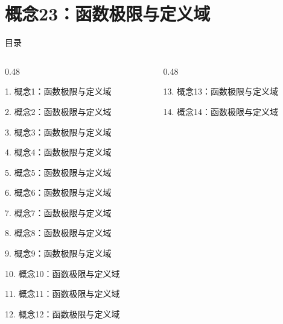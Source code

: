 \documentclass[aspectratio=169,10pt,fontset=fandol]{ctexbeamer}
\begin{document}
\section{概念23：函数极限与定义域}
\begin{frame}[t,fragile]{目录}
\small
\begin{columns}[T,onlytextwidth]
\begin{column}{0.48\textwidth}
{\color{black}\small 1. 概念1：函数极限与定义域\par}\vspace{0.22em}
{\color{black}\small 2. 概念2：函数极限与定义域\par}\vspace{0.22em}
{\color{black}\small 3. 概念3：函数极限与定义域\par}\vspace{0.22em}
{\color{black}\small 4. 概念4：函数极限与定义域\par}\vspace{0.22em}
{\color{black}\small 5. 概念5：函数极限与定义域\par}\vspace{0.22em}
{\color{black}\small 6. 概念6：函数极限与定义域\par}\vspace{0.22em}
{\color{black}\small 7. 概念7：函数极限与定义域\par}\vspace{0.22em}
{\color{black}\small 8. 概念8：函数极限与定义域\par}\vspace{0.22em}
{\color{black}\small 9. 概念9：函数极限与定义域\par}\vspace{0.22em}
{\color{black}\small 10. 概念10：函数极限与定义域\par}\vspace{0.22em}
{\color{black}\small 11. 概念11：函数极限与定义域\par}\vspace{0.22em}
{\color{black}\small 12. 概念12：函数极限与定义域\par}\vspace{0.22em}
\end{column}
\begin{column}{0.48\textwidth}
{\color{black}\small 13. 概念13：函数极限与定义域\par}\vspace{0.22em}
{\color{black}\small 14. 概念14：函数极限与定义域\par}\vspace{0.22em}

\end{column}
\end{columns}
\end{frame}
\end{document}
